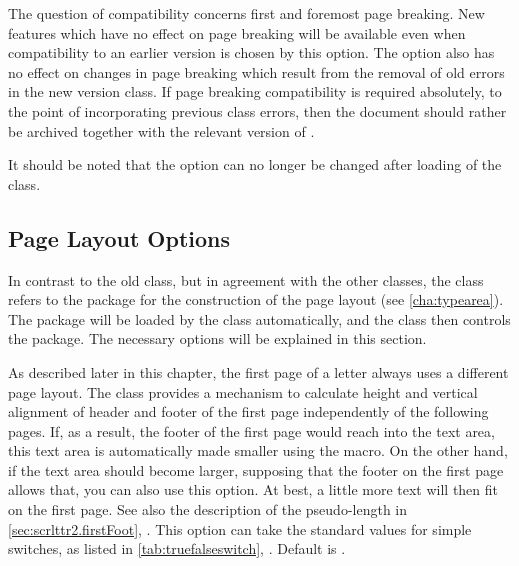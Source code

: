 The question of compatibility concerns first and foremost page
breaking. New features which have no effect on page breaking will be
available even when compatibility to an earlier version is chosen by
this option. The option also has no effect on changes in page breaking
which result from the removal of old errors in the new version
class. If page breaking compatibility is required absolutely, to the
point of incorporating previous class errors, then the document should
rather be archived together with the relevant version of \KOMAScript.

It should be noted that the option  can no longer be
changed after loading of the class.%
%
%
%
%

\subsection{Page Layout Options}
\label{sec:scrlttr2.typeareaOptions}
%

In contrast to the old  class, but in agreement with
the other {\KOMAScript} classes, the  class refers to
the  package for the construction of the page layout
(see \autoref{cha:typearea}). The package will be loaded by the class
automatically, and the class then controls the package. The necessary
options will be explained in this section.

\begin{Declaration}
\end{Declaration}
%
As described later in this chapter, the first page of a letter always
uses a different page layout. The  class provides a
mechanism to calculate height and vertical alignment of header and
footer of the first page independently of the following pages. If, as
a result, the footer of the first page would reach into the text area,
this text area is automatically made smaller using the
 macro. On the other
hand, if the text area should become larger, supposing that the footer
on the first page allows that, you can also use this option. At best,
a little more text will then fit on the first page. See also the
description of the pseudo-length  in
\autoref{sec:scrlttr2.firstFoot},
.  This option can
take the standard values for simple switches, as listed in
\autoref{tab:truefalseswitch},
. Default is
.
%
%
%
%

